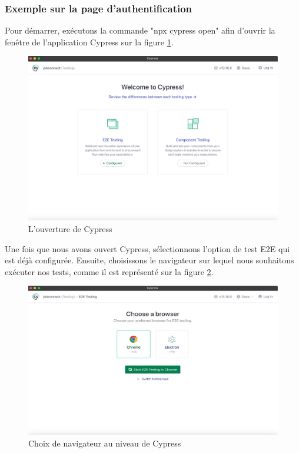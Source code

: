 \subsubsection{Exemple sur la page d’authentification}

Pour démarrer, exécutons la commande "npx cypress open" afin d'ouvrir la fenêtre de l'application Cypress sur la figure \ref{fig:cy1}.
\vspace{4cm}

\begin{figure}[htbp]
   \centering
   \includegraphics[scale=0.2]{cypress/2.jpg} 
   \caption{L'ouverture de Cypress}
   \label{fig:cy1}
\end{figure}

Une fois que nous avons ouvert Cypress, sélectionnons l’option de test E2E qui est déjà configurée. Ensuite, choisissons le navigateur sur lequel nous souhaitons exécuter nos tests, comme il est représenté sur la figure \ref{fig:cy2}.
\begin{figure}[H]
   \centering
   \includegraphics[scale=0.4]{cypress/3.jpg} 
   \caption{Choix de navigateur au niveau de Cypress}
   \label{fig:cy2}
\end{figure}

